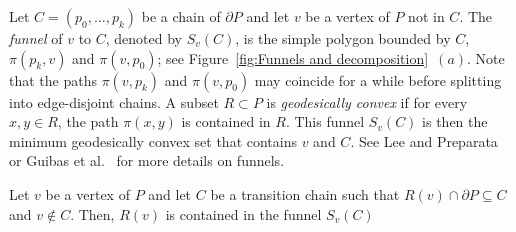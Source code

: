 \documentclass[a4paper,UKenglish]{lipics}
\newcommand{\fn}[2]{\ensuremath{S_{\scriptscriptstyle #1}(#2)}}
\newcommand{\p}[2]{\ensuremath{\pi(#1, #2)}}
\begin{document}
Let $C = (p_0, \ldots, p_k)$ be a chain of $\partial P$ and let $v$ be a vertex of $P$ not in $C$.
The \emph{funnel} of $v$ to $C$, denoted by $\fn{v}{C}$, is the simple polygon bounded by $C$, $\p{p_k}{v}$ and $\p{v}{p_0}$; see Figure~\ref{fig:Funnels and decomposition}~$(a)$. 
Note that the paths $\p{v}{p_k}$ and $\p{v}{p_0}$ may coincide for a while before splitting into edge-disjoint chains. 
A subset $R\subset P$ is \emph{geodesically convex} if for every $x,y\in R$, the path $\p{x}{y}$ is contained in $R$.
This funnel $\fn{v}{C}$ is then the minimum geodesically convex set that contains $v$ and $C$.
See Lee and Preparata~\cite{lee1984euclidean} or Guibas et al.~\cite{guibasShortestPathTree} for more details on funnels.



\begin{lemma}\label{lemma:Funnel contains Voronoi region}
Let $v$ be a vertex of $P$ and let $C$ be a transition chain such that $R(v)\cap \partial P \subseteq C$ and $v\not\in C$.
Then, $R(v)$ is contained in the funnel $\fn{v}{C}$
\end{lemma}
\end{document}

